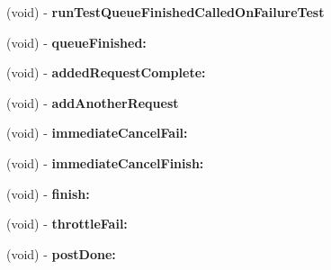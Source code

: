 \begin{DoxyCompactItemize}
\item 
\hypertarget{interface_a_s_i_network_queue_tests_07_08_a863286b45c212a9aff1fd8c9415e8eb8}{
(void) -\/ {\bfseries run\-Test\-Queue\-Finished\-Called\-On\-Failure\-Test}}
\label{interface_a_s_i_network_queue_tests_07_08_a863286b45c212a9aff1fd8c9415e8eb8}

\item 
\hypertarget{interface_a_s_i_network_queue_tests_07_08_a7d969cf7beaae41da4ec7ee5d2f524d4}{
(void) -\/ {\bfseries queue\-Finished\-:}}
\label{interface_a_s_i_network_queue_tests_07_08_a7d969cf7beaae41da4ec7ee5d2f524d4}

\item 
\hypertarget{interface_a_s_i_network_queue_tests_07_08_ab8add5e0479640989a141e56dfcf046a}{
(void) -\/ {\bfseries added\-Request\-Complete\-:}}
\label{interface_a_s_i_network_queue_tests_07_08_ab8add5e0479640989a141e56dfcf046a}

\item 
\hypertarget{interface_a_s_i_network_queue_tests_07_08_a7f9925729daa7cce26bd2301d1b86c2b}{
(void) -\/ {\bfseries add\-Another\-Request}}
\label{interface_a_s_i_network_queue_tests_07_08_a7f9925729daa7cce26bd2301d1b86c2b}

\item 
\hypertarget{interface_a_s_i_network_queue_tests_07_08_ab7c057d1956cb3bda4f21d43260ee1a7}{
(void) -\/ {\bfseries immediate\-Cancel\-Fail\-:}}
\label{interface_a_s_i_network_queue_tests_07_08_ab7c057d1956cb3bda4f21d43260ee1a7}

\item 
\hypertarget{interface_a_s_i_network_queue_tests_07_08_a7d6d1e74ed81581f13c7fa469a78154d}{
(void) -\/ {\bfseries immediate\-Cancel\-Finish\-:}}
\label{interface_a_s_i_network_queue_tests_07_08_a7d6d1e74ed81581f13c7fa469a78154d}

\item 
\hypertarget{interface_a_s_i_network_queue_tests_07_08_a3749253f9e2a43e19ff634c691a289b2}{
(void) -\/ {\bfseries finish\-:}}
\label{interface_a_s_i_network_queue_tests_07_08_a3749253f9e2a43e19ff634c691a289b2}

\item 
\hypertarget{interface_a_s_i_network_queue_tests_07_08_a9afb7d6be102c887541d6bb8c1a85d25}{
(void) -\/ {\bfseries throttle\-Fail\-:}}
\label{interface_a_s_i_network_queue_tests_07_08_a9afb7d6be102c887541d6bb8c1a85d25}

\item 
\hypertarget{interface_a_s_i_network_queue_tests_07_08_a3d6293c5744148bf1485cd9a56a1b3be}{
(void) -\/ {\bfseries post\-Done\-:}}
\label{interface_a_s_i_network_queue_tests_07_08_a3d6293c5744148bf1485cd9a56a1b3be}


\end{DoxyCompactItemize}
